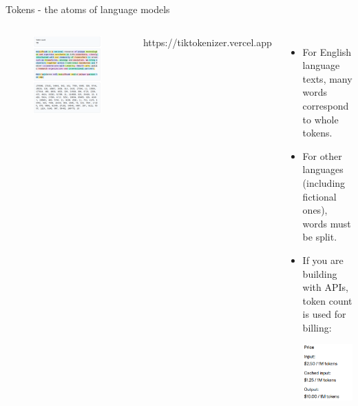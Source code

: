 \documentclass[10pt]{beamer}
\newcommand{\creditleft}[1]{{\par \raggedright \scriptsize \mdseries \color{mDarkBrown} #1 \par}}
\begin{document}
\begin{frame}{Tokens - the atoms of language models}
	\begin{columns}[T,onlytextwidth]
		\hspace*{-0.7cm} 
		\begin{figure}
			\includegraphics[width=\textwidth]{figures/TikTokenizer.png}
		\end{figure}
		\creditleft{https://tiktokenizer.vercel.app} \hfill
		\vspace{1cm}
		\begin{itemize}
			\item For English language texts, many words correspond to whole tokens. 
			\item For other languages (including fictional ones), words must be split.
			 \item If you are building with APIs, token count is used for billing: \par
			 \includegraphics[height=0.3\textheight]{figures/PricingExampleOpenAIGPt4o.png}
		\end{itemize}
	\end{columns}
\end{frame}
\end{document}
